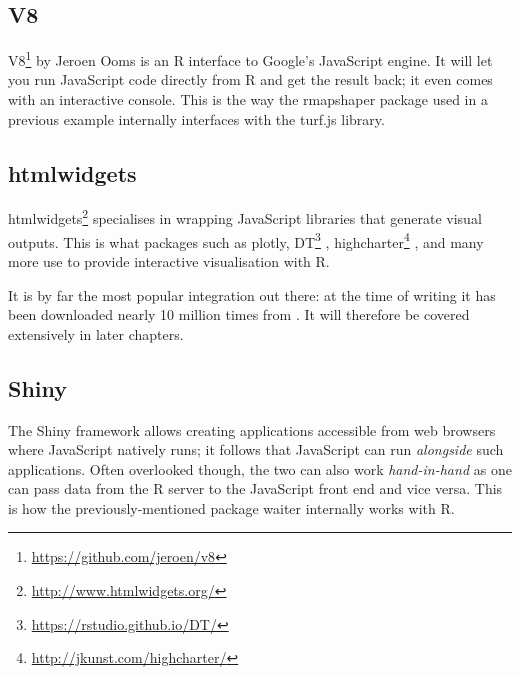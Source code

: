 \documentclass[10pt,]{krantz}
\makeatletter
\newenvironment{Shaded}{\begin{snugshade}}{\end{snugshade}}
\newcommand{\CommentTok}[1]{\textcolor[rgb]{0.37,0.37,0.37}{\textit{#1}}}
\newcommand{\KeywordTok}[1]{\textcolor[rgb]{0.27,0.27,0.27}{\textbf{#1}}}
\newcommand{\NormalTok}[1]{#1}
\newcommand{\OperatorTok}[1]{\textcolor[rgb]{0.43,0.43,0.43}{\textbf{#1}}}
\newcommand{\StringTok}[1]{\textcolor[rgb]{0.5,0.5,0.5}{#1}}
\renewcommand{\href}[2]{#2\footnote{\url{#1}}}
\newenvironment{kframe}{%
\medskip{}
\setlength{\fboxsep}{.8em}
 \def\at@end@of@kframe{}%
 \ifinner\ifhmode%
  \def\at@end@of@kframe{\end{minipage}}%
  \begin{minipage}{\columnwidth}%
 \fi\fi%
 \def\FrameCommand##1{\hskip\@totalleftmargin \hskip-\fboxsep
 \colorbox{shadecolor}{##1}\hskip-\fboxsep
     \hskip-\linewidth \hskip-\@totalleftmargin \hskip\columnwidth}%
 \MakeFramed {\advance\hsize-\width
   \@totalleftmargin\z@ \linewidth\hsize
   \@setminipage}}%
 {\par\unskip\endMakeFramed%
 \at@end@of@kframe}
\renewenvironment{Shaded}{\begin{kframe}}{\end{kframe}}
\makeatother
\begin{document}
\hypertarget{intro-v8}{%
\subsection{V8}\label{intro-v8}}

\href{https://github.com/jeroen/v8}{V8} by Jeroen Ooms is an R interface to Google's JavaScript engine. It will let you run JavaScript code directly from R and get the result back; it even comes with an interactive console. This is the way the rmapshaper package used in a previous example internally interfaces with the turf.js library.

\begin{Shaded}
\end{Shaded}

\hypertarget{intro-htmlwidgets}{%
\subsection{htmlwidgets}\label{intro-htmlwidgets}}

\href{http://www.htmlwidgets.org/}{htmlwidgets} \citep{R-htmlwidgets} specialises in wrapping JavaScript libraries that generate visual outputs. This is what packages such as plotly, \href{https://rstudio.github.io/DT/}{DT} \citep{R-DT}, \href{http://jkunst.com/highcharter/}{highcharter} \citep{R-highcharter}, and many more use to provide interactive visualisation with R.

It is by far the most popular integration out there: at the time of writing it has been downloaded nearly 10 million times from . It will therefore be covered extensively in later chapters.

\hypertarget{intro-shiny}{%
\subsection{Shiny}\label{intro-shiny}}

The Shiny framework allows creating applications accessible from web browsers where JavaScript natively runs; it follows that JavaScript can run \emph{alongside} such applications. Often overlooked though, the two can also work \emph{hand-in-hand} as one can pass data from the R server to the JavaScript front end and vice versa. This is how the previously-mentioned package waiter internally works with R.
\end{document}
